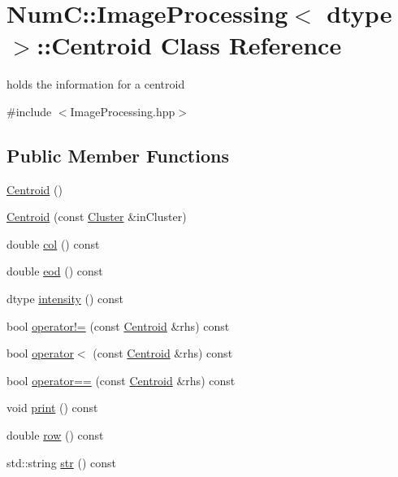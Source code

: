 \hypertarget{class_num_c_1_1_image_processing_1_1_centroid}{}\section{NumC\+:\+:Image\+Processing$<$ dtype $>$\+:\+:Centroid Class Reference}
\label{class_num_c_1_1_image_processing_1_1_centroid}


holds the information for a centroid  




{\ttfamily \#include $<$Image\+Processing.\+hpp$>$}

\subsection*{Public Member Functions}
\begin{DoxyCompactItemize}
\item 
\mbox{\hyperlink{class_num_c_1_1_image_processing_1_1_centroid_ae789a362fe9ad26e1e40186cad8fc8df}{Centroid}} ()
\item 
\mbox{\hyperlink{class_num_c_1_1_image_processing_1_1_centroid_a2097e7c2105c2726e769db04aee6f25e}{Centroid}} (const \mbox{\hyperlink{class_num_c_1_1_image_processing_1_1_cluster}{Cluster}} \&in\+Cluster)
\item 
double \mbox{\hyperlink{class_num_c_1_1_image_processing_1_1_centroid_aac254c03ad05aa1fb43bd7a06952e9bf}{col}} () const
\item 
double \mbox{\hyperlink{class_num_c_1_1_image_processing_1_1_centroid_ac5ac656c68e5c1419a4404d507eeee21}{eod}} () const
\item 
dtype \mbox{\hyperlink{class_num_c_1_1_image_processing_1_1_centroid_a973e81498b872c0a25b65728736ba6ab}{intensity}} () const
\item 
bool \mbox{\hyperlink{class_num_c_1_1_image_processing_1_1_centroid_a19e5b0811bd2e1b6b37f5789a67c2ed7}{operator!=}} (const \mbox{\hyperlink{class_num_c_1_1_image_processing_1_1_centroid}{Centroid}} \&rhs) const
\item 
bool \mbox{\hyperlink{class_num_c_1_1_image_processing_1_1_centroid_a89a4091604f093a891a1b8bf9619bad2}{operator$<$}} (const \mbox{\hyperlink{class_num_c_1_1_image_processing_1_1_centroid}{Centroid}} \&rhs) const
\item 
bool \mbox{\hyperlink{class_num_c_1_1_image_processing_1_1_centroid_af639065a7a27107954ebd034c7cfdb1c}{operator==}} (const \mbox{\hyperlink{class_num_c_1_1_image_processing_1_1_centroid}{Centroid}} \&rhs) const
\item 
void \mbox{\hyperlink{class_num_c_1_1_image_processing_1_1_centroid_aa1f721fbbeebf4409a26103f1a2e3615}{print}} () const
\item 
double \mbox{\hyperlink{class_num_c_1_1_image_processing_1_1_centroid_a59cd9d66283c26d813a6b36cfc92689c}{row}} () const
\item 
std\+::string \mbox{\hyperlink{class_num_c_1_1_image_processing_1_1_centroid_a2fbcff50f43883bd28a65ef9fdfbe4fa}{str}} () const
\end{DoxyCompactItemize}
